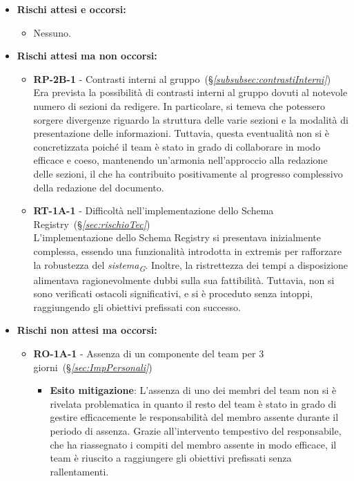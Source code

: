 \begin{itemize}
    \item \textbf{Rischi attesi e occorsi:}
        \begin{itemize}
            \item Nessuno.
        \end{itemize}
    \item \textbf{Rischi attesi ma non occorsi:}
        \begin{itemize}
            \item \textbf{RP-2B-1} - Contrasti interni al gruppo~(\S\textit{\ref{subsubsec:contrastiInterni}}) \\
            Era prevista la possibilità di contrasti interni al gruppo dovuti al notevole numero di sezioni da redigere. In particolare, si temeva che potessero sorgere divergenze riguardo la struttura delle varie sezioni e la modalità di presentazione delle informazioni. Tuttavia, questa eventualità non si è concretizzata poiché il team è stato in grado di collaborare in modo efficace e coeso, mantenendo un'armonia nell'approccio alla redazione delle sezioni, il che ha contribuito positivamente al progresso complessivo della redazione del documento.
            \item \textbf{RT-1A-1} - Difficoltà nell’implementazione dello Schema Registry~(\S\textit{\ref{sec:rischioTec}}) \\
            L'implementazione dello Schema Registry si presentava inizialmente complessa, essendo una funzionalità introdotta in extremis per rafforzare la robustezza del \textit{sistema}\textsubscript{\textit{G}}. Inoltre, la ristrettezza dei tempi a disposizione alimentava ragionevolmente dubbi sulla sua fattibilità. Tuttavia, non si sono verificati ostacoli significativi, e si è proceduto senza intoppi, raggiungendo gli obiettivi prefissati con successo.
        \end{itemize}
    \item \textbf{Rischi non attesi ma occorsi:}
        \begin{itemize}
            \item \textbf{RO-1A-1} - Assenza di un componente del team per 3 giorni~(\S\textit{\ref{sec:ImpPersonali}})
                \begin{itemize}
                    \item \textbf{Esito mitigazione}: L'assenza di uno dei membri del team non si è rivelata problematica in quanto il resto del team è stato in grado di gestire efficacemente le responsabilità del membro assente durante il periodo di assenza. Grazie all'intervento tempestivo del responsabile, che ha riassegnato i compiti del membro assente in modo efficace, il team è riuscito a raggiungere gli obiettivi prefissati senza rallentamenti.

\end{itemize}
\end{itemize}
\end{itemize}
